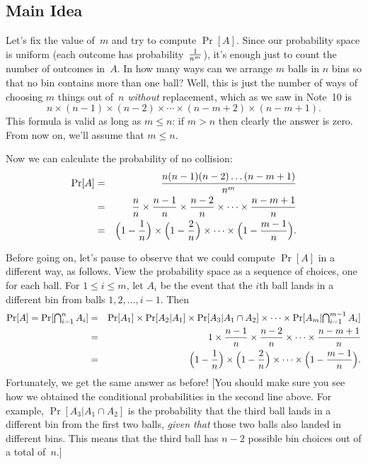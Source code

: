 \documentclass[11pt]{article}
\begin{document}
\subsection*{Main Idea}
Let's fix the value of~$m$ and try to compute $\Pr[A]$.  Since our
probability space is uniform (each outcome has probability~$1\over{n^m}$),
it's enough just to count the number of outcomes in~$A$.  In how many
ways can we arrange $m$ balls in $n$ bins so that no bin contains more
than one ball?  Well, this is just the number of ways of choosing $m$
things out of~$n$ {\it without\/} replacement, which as we saw in Note~10
is $$
   n\times(n-1)\times(n-2)\times\cdots\times(n-m+2)\times(n-m+1).  $$
This formula is valid as long as $m\le n$: if $m>n$ then clearly the
answer is zero.  From now on, we'll assume that $m\le n$.

Now we can calculate the probability of no collision:
\begin{eqnarray}
    \Pr[A] &=& {{n(n-1)(n-2)\ldots(n-m+1)}\over{n^m}}\nonumber\\
           &=& {n\over n}\times{{n-1}\over n}\times{{n-2}\over n}\times
                              \cdots\times{{n-m+1}\over n}\nonumber\\
           &=& \Bigl(1-{1\over n}\Bigr)\times\Bigl(1-{2\over n}\Bigr)\times\cdots\times\Bigl(1-{{m-1}\over n}\Bigr).\label{eq1}
\end{eqnarray}

Before going on, let's pause to observe that we could compute $\Pr[A]$
in a different way, as follows.  View the probability space as a sequence
of choices, one for each ball.  For $1\le i\le m$, let
$A_i$ be the event that the $i$th ball lands in a different bin from balls
$1,2,\ldots,i-1$.  Then
\begin{eqnarray}
   \Pr[A]=\Pr[{\textstyle\bigcap_{i=1}^n A_i}]
        &=&\Pr[A_1]\times\Pr[A_2\vert A_1]\times\Pr[A_3\vert A_1\cap A_2]\times\cdots\times\Pr[A_m\vert{\textstyle\bigcap_{i=1}^{m-1}A_i}]\nonumber\\
        &=&1\times{{n-1}\over n}\times{{n-2}\over n}\times\cdots\times{{n-m+1}\over n}\nonumber\\
        &=&\Bigl(1-{1\over n}\Bigr)\times\Bigl(1-{2\over n}\Bigr)\times\cdots\times\Bigl(1-{{m-1}\over n}\Bigr).\nonumber
\end{eqnarray}
Fortunately, we get the same answer as before!  [You should make sure you
see how we obtained the conditional probabilities in the second line
above.  For example, $\Pr[A_3\vert A_1\cap A_2]$ is the probability that the
third ball lands in a different bin from the first two balls, {\it given
that\/} those two balls also landed in different bins.  This means that
the third ball has $n-2$ possible bin choices out of a total of~$n$.]
\end{document}

